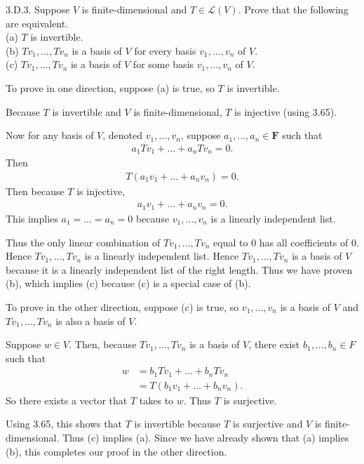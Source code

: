 \documentclass[a5paper]{article}
\begin{document}
\newcommand   \C           {\mathbf{C}}
\newcommand   \R           {\mathbf{R}}
\renewcommand \L           {\mathcal{L}}
\newcommand   \F           {\mathbf{F}}
\renewcommand \P           {\mathcal{P}}
\newcommand   \M           {\mathcal{M}}
\newcommand   \op          {\operatorname}

    3.D.3.
    Suppose $V$ is finite-dimensional and $T \in \L(V)$.
    Prove that the following are equivalent. \\
    (a) $T$ is invertible. \\
    (b) $Tv_1,\dots,Tv_n$ is a basis of $V$ for every basis $v_1,\dots,v_n$ of $V$. \\
    (c) $Tv_1,\dots,Tv_n$ is a basis of $V$ for some basis $v_1,\dots,v_n$ of $V$.

    To prove in one direction, suppose (a) is true, so $T$ is invertible.

    Because $T$ is invertible and $V$ is finite-dimensional, $T$ is injective (using 3.65).

    Now for any basis of $V$, denoted $v_1,\dots,v_n$, suppose $a_1,\dots,a_n \in \F$ such that
\begin{align*}
        a_1 Tv_1 + \dots + a_n Tv_n = 0 .
\end{align*}
    Then
\begin{align*}
        T (a_1 v_1 + \dots + a_n v_n) = 0 .
\end{align*}
    Then because $T$ is injective,
\begin{align*}
        a_1 v_1 + \dots + a_n v_n = 0 .
\end{align*}
    This implies $a_1=\dots=a_n=0$ because $v_1,\dots,v_n$ is a linearly independent list.

    Thus the only linear combination of $Tv_1,\dots,Tv_n$ equal to 0 has all coefficients of 0.
    Hence $Tv_1,\dots,Tv_n$ is a linearly independent list.
    Hence $Tv_1,\dots,Tv_n$ is a basis of $V$ because it is a linearly independent list of the right length.
    Thus we have proven (b), which implies (c) because (c) is a special case of (b).

    To prove in the other direction, suppose (c) is true, so $v_1,\dots,v_n$ is a basis of $V$ and $Tv_1,\dots,Tv_n$ is also a basis of $V$.

    Suppose $w \in V$.
    Then, because $Tv_1,\dots,Tv_n$ is a basis of $V$, there exist $b_1,\dots,b_n \in F$ such that
\begin{align*}
        w &= b_1 Tv_1 + \dots + b_n Tv_n \\
          &= T (b_1 v_1 + \dots + b_n v_n) .
\end{align*}
    So there exists a vector that $T$ takes to $w$.
    Thus $T$ is surjective.

    Using 3.65, this shows that $T$ is invertible because $T$ is surjective and $V$ is finite-dimensional.
    Thus (c) implies (a).
    Since we have already shown that (a) implies (b), this completes our proof in the other direction.
\end{document}
